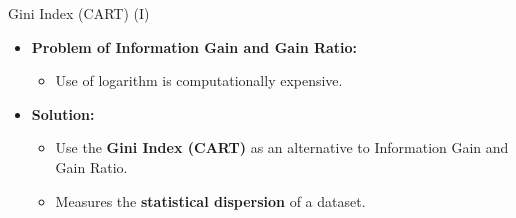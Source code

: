\begin{frame}{Gini Index (CART) (I)}
	\begin{itemize}
		\item \textbf{Problem of Information Gain and Gain Ratio:}
		      \begin{itemize}
			      \item Use of logarithm is computationally expensive.
		      \end{itemize}
		\item \textbf{Solution:}
		      \begin{itemize}
			      \item Use the \textbf{Gini Index (CART)} as an alternative to Information Gain and Gain Ratio.
			      \item Measures the \textbf{statistical dispersion} of a dataset.
		      \end{itemize}

	\end{itemize}
\end{frame}

